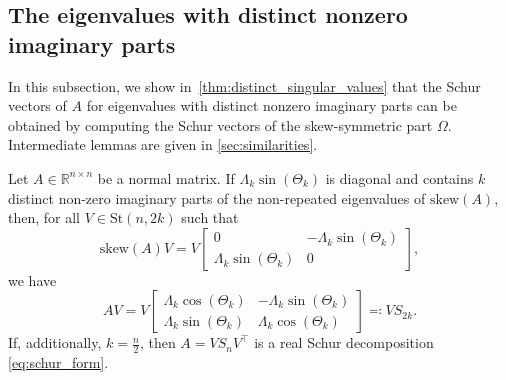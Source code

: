 \documentclass[10pt,twoside,dvipsnames]{siamart1116}
\numberwithin{algorithm}{section}
\numberwithin{equation}{section}
\begin{document}
	\subsection{The eigenvalues with distinct nonzero imaginary parts} \label{subsec:case1}
	In this subsection, we show in~\cref{thm:distinct_singular_values} that the Schur vectors of $A$ for eigenvalues with distinct nonzero imaginary parts can be obtained by computing the Schur vectors of the skew-symmetric part $\Omega$. Intermediate lemmas are given in \cref{sec:similarities}.
\begin{theorem}\label{thm:distinct_singular_values}
Let $A\in\mathbb{R}^{n\times n}$ be a normal matrix. If $\Lambda_k\sin(\Theta_k)$ is diagonal and contains $k$ distinct non-zero imaginary parts of the non-repeated eigenvalues of $\mathrm{skew}(A)$, then, for all $V\in\mathrm{St}(n,2k)$ such that
	\begin{equation}
	\nonumber
		\mathrm{skew}(A)V =V \begin{bmatrix}
	0&-\Lambda_k\sin(\Theta_k)\\
	 \Lambda_k\sin(\Theta_k)&0
	\end{bmatrix},
	\end{equation}
	 we have
	\begin{equation}
	\nonumber
	 AV = V \begin{bmatrix}
	\Lambda_k\cos(\Theta_k)&-\Lambda_k\sin(\Theta_k)\\
	 \Lambda_k\sin(\Theta_k)&\Lambda_k\cos(\Theta_k)
	\end{bmatrix}\eqcolon V S_{2k}.
	\end{equation}
	If, additionally, $k=\frac{n}{2}$, then $A = VS_{n}V^\top $ is a real Schur decomposition \eqref{eq:schur_form}.
	\end{theorem}
\end{document}
